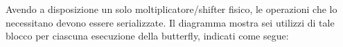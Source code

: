 \noindent Avendo a disposizione un solo moltiplicatore/shifter fisico, le operazioni che lo necessitano devono essere serializzate. Il diagramma mostra sei utilizzi di tale blocco per ciascuna esecuzione della butterfly, indicati come segue:

